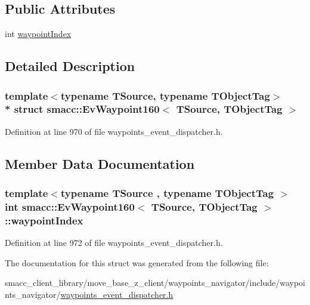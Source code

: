 \subsection*{Public Attributes}
\begin{DoxyCompactItemize}
\item 
int \hyperlink{structsmacc_1_1EvWaypoint160_ab464d12d545516c492ce21d5f222dd97}{waypoint\+Index}
\end{DoxyCompactItemize}


\subsection{Detailed Description}
\subsubsection*{template$<$typename T\+Source, typename T\+Object\+Tag$>$\\*
struct smacc\+::\+Ev\+Waypoint160$<$ T\+Source, T\+Object\+Tag $>$}



Definition at line 970 of file waypoints\+\_\+event\+\_\+dispatcher.\+h.



\subsection{Member Data Documentation}
\subsubsection[{\texorpdfstring{waypoint\+Index}{waypointIndex}}]{\setlength{\rightskip}{0pt plus 5cm}template$<$typename T\+Source , typename T\+Object\+Tag $>$ int {\bf smacc\+::\+Ev\+Waypoint160}$<$ T\+Source, T\+Object\+Tag $>$\+::waypoint\+Index}\hypertarget{structsmacc_1_1EvWaypoint160_ab464d12d545516c492ce21d5f222dd97}{}\label{structsmacc_1_1EvWaypoint160_ab464d12d545516c492ce21d5f222dd97}


Definition at line 972 of file waypoints\+\_\+event\+\_\+dispatcher.\+h.



The documentation for this struct was generated from the following file\+:\begin{DoxyCompactItemize}
\item 
smacc\+\_\+client\+\_\+library/move\+\_\+base\+\_\+z\+\_\+client/waypoints\+\_\+navigator/include/waypoints\+\_\+navigator/\hyperlink{waypoints__event__dispatcher_8h}{waypoints\+\_\+event\+\_\+dispatcher.\+h}\end{DoxyCompactItemize}
